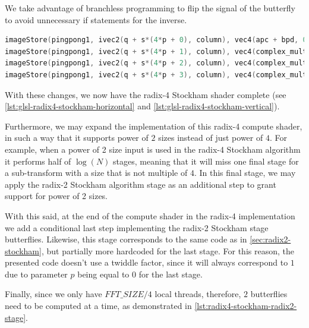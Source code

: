\documentclass[
  oneside,
  11pt, a4paper,
  footinclude=true,
  headinclude=true,
  cleardoublepage=empty
]{scrbook}
\begin{document}
We take advantage of branchless programming to flip the signal of the butterfly to avoid unnecessary if statements for the inverse.

\begin{lstlisting}[language=C, caption={Radix-4 Stockham dragonfly inverse arithmetic}, label={lst:radix4-stockham-dragonfly-arithmetic}]
imageStore(pingpong1, ivec2(q + s*(4*p + 0), column), vec4(apc + bpd, 0,0));
imageStore(pingpong1, ivec2(q + s*(4*p + 1), column), vec4(complex_mult(w1p, amc + jbmd*fft_dir), 0,0));
imageStore(pingpong1, ivec2(q + s*(4*p + 2), column), vec4(complex_mult(w2p, apc - bpd ), 0,0));
imageStore(pingpong1, ivec2(q + s*(4*p + 3), column), vec4(complex_mult(w3p, amc - jbmd*fft_dir), 0,0));
\end{lstlisting}


With these changes, we now have the radix-4 Stockham shader complete (see \autoref{lst:glsl-radix4-stockham-horizontal} and \autoref{lst:glsl-radix4-stockham-vertical}).
\newline 

Furthermore, we may expand the implementation of this radix-4 compute shader, in such a way that it supports power of $2$ sizes instead of just power of $4$. For example, when a power of 2 size input is used in the radix-4 Stockham algorithm it performs half of $\log{(N)}$ stages, meaning that it will miss one final stage for a sub-transform with a size that is not multiple of $4$. In this final stage, we may apply the radix-2 Stockham algorithm stage as an additional step to grant support for power of 2 sizes.

With this said, at the end of the compute shader in the radix-4 implementation we add a conditional last step implementing the radix-2 Stockham stage butterflies. Likewise, this stage corresponds to the same code as in \autoref{sec:radix2-stockham}, but partially more hardcoded for the last stage. For this reason, the presented code doesn't use a twiddle factor, since it will always correspond to $1$ due to parameter $p$ being equal to $0$ for the last stage.

Finally, since we only have $FFT\_SIZE/4$ local threads, therefore, $2$ butterflies need to be computed at a time, as demonstrated in \autoref{lst:radix4-stockham-radix2-stage}.
\end{document}
